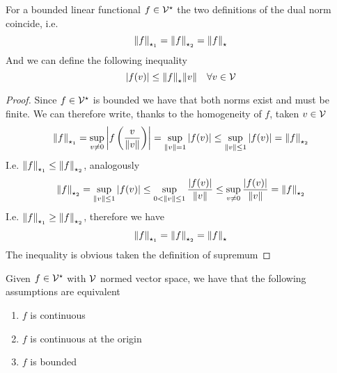 \documentclass[../complete.tex]{subfiles}
\begin{document}
\begin{thm}
	For a bounded linear functional $f\in\mathcal{V}^\star$ the two definitions of the dual norm coincide, i.e.
	\begin{equation*}
		\norm{f}_{\star_1}=\norm{f}_{\star_2}=\norm{f}_{\star}
	\end{equation*}
	And we can define the following inequality
	\begin{equation}
		\abs{f(v)}\le\norm{f}_{\star}\norm{v}\quad\forall v\in\mathcal{V}
		\label{eq:ineqdnorm}
	\end{equation}
\end{thm}
\begin{proof}
	Since $f\in\mathcal{V}^\star$ is bounded we have that both norms exist and must be finite. We can therefore write, thanks to the homogeneity of $f$, taken $v\in\mathcal{V}$
	\begin{equation*}
		\norm{f}_{\star_1}=\sup_{v\ne0}\abs{f\left( \frac{v}{\norm{v}} \right)}=\sup_{\norm{v}=1}\abs{f(v)}\le\sup_{\norm{v}\le1}\abs{f(v)}=\norm{f}_{\star_2}
	\end{equation*}
	I.e. $\norm{f}_{\star_1}\le\norm{f}_{\star_2}$, analogously
	\begin{equation*}
		\norm{f}_{\star_2}=\sup_{\norm{v}\le1}\abs{f(v)}\le\sup_{0<\norm{v}\le1}\frac{\abs{f(v)}}{\norm{v}}\le\sup_{v\ne0}\frac{\abs{f(v)}}{\norm{v}}=\norm{f}_{\star_2}
	\end{equation*}
	I.e. $\norm{f}_{\star_1}\ge\norm{f}_{\star_2}$, therefore we have
	\begin{equation*}
		\norm{f}_{\star_1}=\norm{f}_{\star_2}=\norm{f}_{\star}
	\end{equation*}
	The inequality is obvious taken the definition of supremum
\end{proof}
\begin{thm}
	Given $f\in\mathcal{V}^\star$ with $\mathcal{V}$ normed vector space, we have that the following assumptions are equivalent
	\begin{enumerate}
	\item $f$ is continuous
	\item $f$ is continuous at the origin
	\item $f$ is bounded
	\end{enumerate}
\end{thm}
\end{document}
